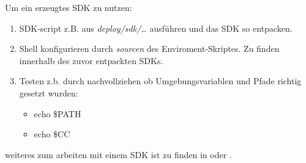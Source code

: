Um ein erzeugtes SDK zu nutzen:
\begin{enumerate}
    \item SDK-script z.B. aus \textit{deploy/sdk/\ldots} ausführen und das SDK
        so entpacken.
    \item Shell konfigurieren durch \textit{sourcen} des Enviroment-Skriptes. Zu
        finden innerhalb des zuvor entpackten SDKs.
    \item Testen z.b. durch nachvollziehen ob Umgebungsvariablen und Pfade
        richtig gesetzt wurden:
        \begin{itemize}
            \item echo \$PATH
            \item echo \$CC
        \end{itemize}
\end{enumerate}


weiteres zum arbeiten mit einem SDK ist zu finden in \cite{Gonzalez2018} oder
\cite{PTDG}.
